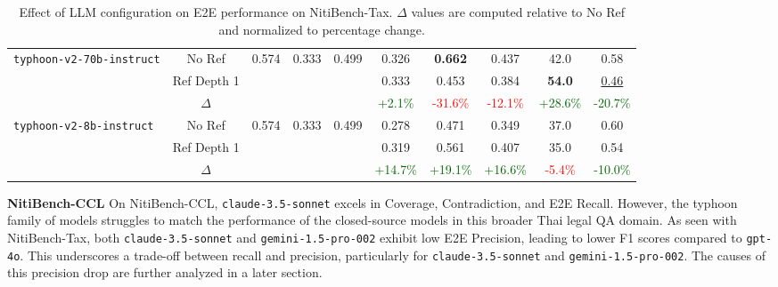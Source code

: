 \begin{table}[!ht]
{\begin{tabular}{@{}lccccccccc@{}}
\multirow{3}{*}{\texttt{typhoon-v2-70b-instruct}} 
& No Ref            
  & \multirow{3}{*}{0.574} & \multirow{3}{*}{0.333} & \multirow{3}{*}{0.499}
  & 0.326 & \textbf{0.662} & 0.437 
  & 42.0  & 0.58 \\
& \cellcolor{lightgray}Ref Depth 1  
  & 
  & 
  &  
  & \cellcolor{lightgray}0.333 
  & \cellcolor{lightgray}0.453 
  & \cellcolor{lightgray}0.384 
  & \cellcolor{lightgray}\textbf{54.0 }
  & \cellcolor{lightgray}\underline{0.46} \\
& $\Delta$           
  & 
  & 
  & 
  & \textcolor{darkgreen}{+2.1\%}
  & \textcolor{red}{-31.6\%}
  & \textcolor{red}{-12.1\%}
  & \textcolor{darkgreen}{+28.6\%}
  & \textcolor{darkgreen}{-20.7\%} \\
\midrule

\multirow{3}{*}{\texttt{typhoon-v2-8b-instruct}} 
& No Ref            
  & \multirow{3}{*}{0.574} & \multirow{3}{*}{0.333} & \multirow{3}{*}{0.499 }
  & 0.278 & 0.471 & 0.349 
  & 37.0  & 0.60 \\
& \cellcolor{lightgray}Ref Depth 1  
  & 
  & 
  & 
  & \cellcolor{lightgray}0.319 
  & \cellcolor{lightgray}0.561 
  & \cellcolor{lightgray}0.407 
  & \cellcolor{lightgray}35.0 
  & \cellcolor{lightgray}0.54 \\
& $\Delta$           
  & 
  & 
  & 
  & \textcolor{darkgreen}{+14.7\%}
  & \textcolor{darkgreen}{+19.1\%}
  & \textcolor{darkgreen}{+16.6\%}
  & \textcolor{red}{-5.4\%}
  & \textcolor{darkgreen}{-10.0\%} \\
\bottomrule
\end{tabular}
}
\caption{Effect of LLM configuration on E2E performance on NitiBench-Tax. 
\(\Delta\) values are computed relative to No Ref and normalized to percentage change.}
\label{table: llm_e2e_main_tax}
\end{table}


\textbf{NitiBench-CCL} On NitiBench-CCL, \texttt{claude-3.5-sonnet} excels in Coverage, Contradiction, and E2E Recall. 
%
However, the typhoon family of models struggles to match the performance of the closed-source models in this broader Thai legal QA domain. 
%
As seen with NitiBench-Tax, both \texttt{claude-3.5-sonnet} and \texttt{gemini-1.5-pro-002} exhibit low E2E Precision, leading to lower F1 scores compared to \texttt{gpt-4o}. 
%
This underscores a trade-off between recall and precision, particularly for \texttt{claude-3.5-sonnet} and \texttt{gemini-1.5-pro-002}. 
%
The causes of this precision drop are further analyzed in a later section.

